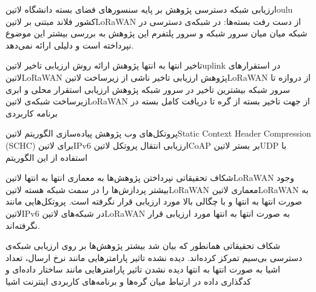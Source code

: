 \documentclass[dvipsnames]{beamer}
\begin{document}
\begin{persian}
	\begin{frame}{ارزیابی شبکه دسترسی}
		 پژوهش  بر پایه سنسورهای فضای بسته دانشگاه ‌لاتین{oulu} کشور فلاند مبتنی بر ‌لاتین{LoRaWAN}
		 از دست رفت بسته‌ها:
		 در شبکه‌ی دسترسی
		 در شبکه میان میان سرور شبکه و سرور پلتفرم
		 این پژوهش به بررسی بیشتر این موضوع نپرداخته است و دلیلی ارائه نمی‌دهد.
	\end{frame}

	\begin{frame}{تاخیر انتها به انتها}
		 پژوهش 
		 ارائه روش ارزیابی تاخیر ‌لاتین{uplink} در استقرارهای ‌لاتین{LoRaWAN}
		 پژوهش 
		 ارزیابی تاخیر ناشی از زیرساخت ‌لاتین{LoRaWAN} از دروازه تا سرور شبکه
		 بیشترین تاخیر در سرور شبکه
		 پژوهش 
		 ارزیابی استقرار محلی و ابری زیرساخت شبکه‌ی ‌لاتین{LoRaWAN} از جهت تاخیر بسته از گره تا دریافت کامل بسته در برنامه کاربردی
	\end{frame}

	\begin{frame}{پروتکل‌های وب}
		 پژوهش 
		 پیاده‌سازی الگوریتم ‌لاتین{Static Context Header Compression (SCHC)} برای ‌لاتین{IPv6}
		 ارزیابی انتقال پروتکل ‌لاتین{CoAP} بر بستر ‌لاتین{UDP} با استفاده از این الگوریتم
	\end{frame}

	\begin{frame}{شکاف تحقیقاتی}
		 نپرداختن پژوهش‌ها به معماری انتها به انتها ‌لاتین{LoRaWAN}
		 وجود بیشتر پردازش‌ها را در سمت شبکه هسته ‌لاتین{LoRaWAN}
		 معماری ‌لاتین{LoRaWAN} به صورت انتها به انتها و با چگالی بالا مورد ارزیابی قرار نگرفته است.
		 پروتکل‌هایی مانند ‌لاتین{IPv6} در شبکه‌های ‌لاتین{LoRaWAN} به صورت انتها به انتها مورد ارزیابی قرار نگرفته‌اند.
	\end{frame}

	\begin{frame}{شکاف تحقیقاتی}
		 همانطور که بیان شد بیشتر پژوهش‌ها بر روی ارزیابی شبکه‌ی دسترسی بی‌سیم تمرکز کرده‌اند.
		 دیده نشده تاثیر پارامترهایی مانند نرخ ارسال، تعداد اشیا به صورت انتها به انتها
		 دیده نشدن تاثیر پارامترهایی مانند ساختار داده‌ای و کدگذاری داده در ارتباط میان گره‌ها و برنامه‌های کاربردی اینترنت اشیا
	\end{frame}


\end{persian}
\end{document}

